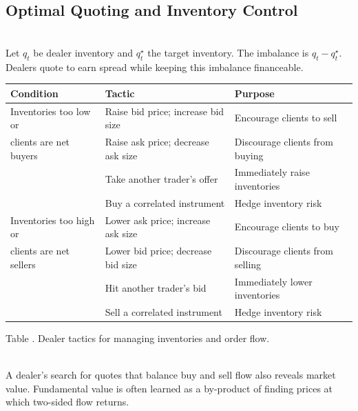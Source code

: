 \subsection{Optimal Quoting and Inventory Control}

\begin{definition} \\
Let $q_t$ be dealer inventory and $q_t^\star$ the target inventory. The imbalance is $q_t-q_t^\star$. Dealers quote to earn spread while keeping this imbalance financeable.
\end{definition}

\begin{table}[htbp]
\centering
\scriptsize
{}
\renewcommand{\arraystretch}{1.13}
\setlength{\tabcolsep}{4pt}
\begin{tabularx}{\textwidth}{@{}>{\RaggedRight\arraybackslash}p{} >{\RaggedRight\arraybackslash}p{} >{\RaggedRight\arraybackslash}X@{}}
\hline
\textbf{Condition} & \textbf{Tactic} & \textbf{Purpose} \\
\hline
Inventories too low or & Raise bid price; increase bid size & Encourage clients to sell \\
clients are net buyers & Raise ask price; decrease ask size & Discourage clients from buying \\
& Take another trader's offer & Immediately raise inventories \\
& Buy a correlated instrument & Hedge inventory risk \\
\hline
Inventories too high or & Lower ask price; increase ask size & Encourage clients to buy \\
clients are net sellers & Lower bid price; decrease bid size & Discourage clients from selling \\
& Hit another trader's bid & Immediately lower inventories \\
& Sell a correlated instrument & Hedge inventory risk \\
\hline
\end{tabularx}

\vspace{0.25em}
{\footnotesize Table \thetable. Dealer tactics for managing inventories and order flow.}
\end{table}

\begin{principle} \\
A dealer's search for quotes that balance buy and sell flow also reveals market value. Fundamental value is often learned as a by-product of finding prices at which two-sided flow returns.
\end{principle}

